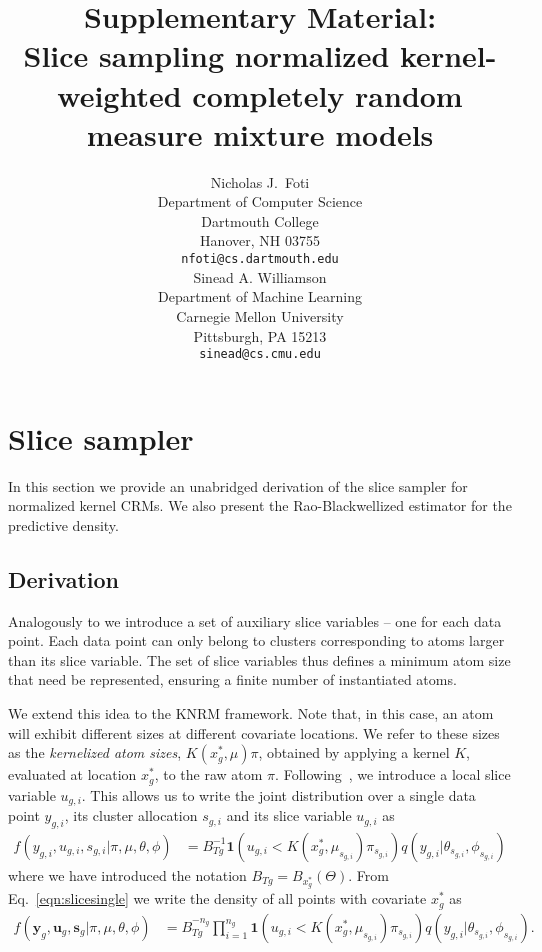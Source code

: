 \documentclass{article} %
\title{Supplementary Material: \\ Slice sampling normalized kernel-weighted completely random 
measure mixture models}
\author{
Nicholas J.~Foti \\
Department of Computer Science\\
Dartmouth College\\
Hanover, NH 03755 \\
\texttt{nfoti@cs.dartmouth.edu} \\
\And
Sinead A. Williamson \\
Department of Machine Learning \\
Carnegie Mellon University \\
Pittsburgh, PA 15213 \\
\texttt{sinead@cs.cmu.edu} \\
}
\newcommand{\idf}[1]{\mathbf 1 \left ( #1 \right )}
\begin{document}
\maketitle


\section{Slice sampler}

In this section we provide an unabridged derivation of the slice sampler for normalized
kernel CRMs.  We also present the Rao-Blackwellized estimator for the predictive
density.

\subsection{Derivation}
Analogously to \cite{GriffinWalker:2011} we introduce a set of auxiliary
slice variables -- one for each data point. Each data point can only belong to
clusters corresponding to atoms larger than its slice variable. The set of
slice variables thus defines a minimum atom size that need be represented,
ensuring a finite number of instantiated atoms.

We extend this idea to the KNRM framework. Note that, in this case, an atom
will exhibit different sizes at different covariate locations. We refer to
these sizes as the \emph{kernelized atom sizes}, $K(x_g^*,\mu)\pi$, obtained by
applying a kernel $K$, evaluated at location $x^*_g$, to the raw atom $\pi$.
Following~\cite{GriffinWalker:2011}, we introduce a local slice variable $u_{g,i}$. This allows
us to write the joint distribution over a single data point $y_{g,i}$, its
cluster allocation $s_{g,i}$ and its slice variable $u_{g,i}$ as 
\begin{align}
  f(y_{g,i}, u_{g,i}, s_{g,i}|\pi, \mu, \theta, \phi) &= 
  B^{-1}_{Tg} \idf{ u_{g,i} < K(x^*_g,\mu_{s_{g,i}})\pi_{s_{g,i}} }  
  q(y_{g,i} | \theta_{s_{g,i}}, \phi_{s_{g,i}})
  \label{eqn:slicesingle}
\end{align}
where we have introduced the notation $B_{Tg} = B_{x^*_g}(\Theta)$.  From
Eq.~\ref{eqn:slicesingle} we write the density of all points with covariate $x^*_g$
as
\begin{align}
  f({\mathbf y}_g, {\mathbf u}_g, {\mathbf s}_g | \pi, \mu, \theta, \phi) &=
  B^{-n_g}_{Tg} \prod_{i=1}^{n_g} \idf{ u_{g,i}
  < K(x^*_g,\mu_{s_{g,i}})\pi_{s_{g,i}} } q(y_{g,i} | \theta_{s_{g,i}},
  \phi_{s_{g,i}}).
  \label{eqn:slicegroup}
\end{align}
\end{document}
